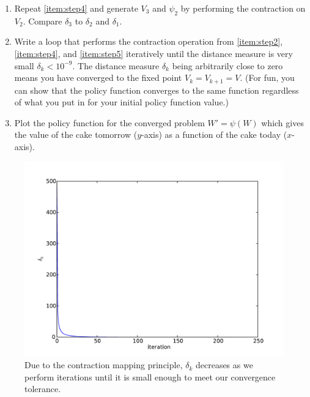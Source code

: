 \begin{problem}
\begin{enumerate}
\item \label{item:step5} Repeat \ref{item:step4} and generate $V_3$ and $\psi_2$ by performing the contraction on $V_2$. Compare $\delta_3$ to $\delta_2$ and $\delta_1$.

\item Write a loop that performs the contraction operation from \ref{item:step2}, \ref{item:step4}, and \ref{item:step5} iteratively until the distance measure is very small $\delta_k < 10^{-9}$.  The distance measure $\delta_k$ being arbitrarily close to zero means you have converged to the fixed point $V_k = V_{k+1} = V$. (For fun, you can show that the policy function converges to the same function regardless of what you put in for your initial policy function value.)

\item Plot the policy function for the converged problem $W' = \psi\left(W\right)$ which gives the value of the cake tomorrow ($y$-axis) as a function of the cake today ($x$-axis).
\end{enumerate}
\end{problem} 

\begin{figure}
\includegraphics[width=\textwidth]{convergence.pdf}
\caption{Due to the contraction mapping principle, $\delta_k$ decreases as we perform iterations until it is small enough to meet our convergence tolerance.}
\end{figure}
